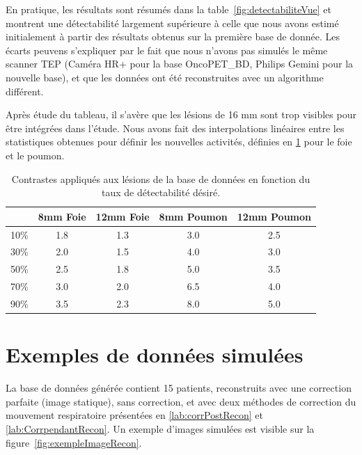 En pratique, les résultats sont résumés dans la table~\ref{fig:detectabiliteVue} et montrent une détectabilité largement supérieure à celle que nous avons estimé initialement à partir des résultats obtenus sur la première base de donnée. Les écarts peuvens s'expliquer par le fait que nous n'avons pas simulés le même scanner TEP (Caméra HR+ pour la base OncoPET\_BD, Philips Gemini pour la nouvelle base), et que les données ont été reconstruites avec un algorithme différent.

Après étude du tableau, il s'avère que les lésions de 16 mm sont trop visibles pour être intégrées dans l'étude. Nous avons fait des interpolations linéaires entre les statistiques obtenues pour définir les nouvelles activités, définies en \ref{tab:contrasteFoieFinal} pour le foie et le poumon.



\begin{table}

\centering

\begin{tabular}{|c||c|c||c|c|}
 \hline
	& 8mm Foie	& 12mm Foie	& 8mm Poumon	& 12mm Poumon	\\
\hline
10\%	& 1.8		& 1.3		& 3.0		& 2.5		\\
\hline
30\%	& 2.0		& 1.5		& 4.0		& 3.0		\\
\hline
50\%	& 2.5		& 1.8		& 5.0		& 3.5		\\
\hline
70\%	& 3.0		& 2.0		& 6.5		& 4.0		\\
\hline
90\%	& 3.5		& 2.3		& 8.0		& 5.0		\\
\hline
\end{tabular}
\caption[Contraste final lésions du foie et du poumon]{Contrastes appliqués aux lésions de la base de données en fonction du taux de détectabilité désiré.}
\label{tab:contrasteFoieFinal}
\end{table}



\section{Exemples de données simulées}

La base de données générée contient 15 patients, reconstruits avec une correction parfaite (image statique), sans correction, et avec deux méthodes de correction du mouvement respiratoire présentées en \ref{lab:corrPostRecon} et \ref{lab:CorrpendantRecon}. Un exemple d'images simulées est visible sur la figure~\ref{fig:exempleImageRecon}.


